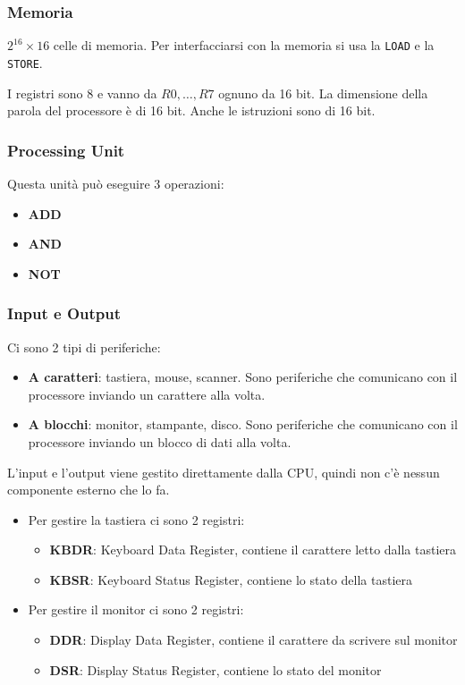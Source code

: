 \documentclass[a4paper]{article}
\theoremstyle{break}
\theoremstyle{break}
\theoremstyle{break}
\theoremstyle{break}
\begin{document}
\subsubsection{Memoria}
\( 2^{16} \times 16 \) celle di memoria. Per interfacciarsi con la memoria si usa la
\texttt{LOAD} e la \texttt{STORE}.

\vspace{1em}
\noindent I registri sono 8 e vanno da \( R0, \ldots, R7 \) ognuno da 16 bit. La dimensione
della parola del processore è di 16 bit. Anche le istruzioni sono di 16 bit.

\subsubsection{Processing Unit}
Questa unità può eseguire 3 operazioni:
\begin{itemize}
	\item \textbf{ADD}
	\item \textbf{AND}
	\item \textbf{NOT}
\end{itemize}

\subsubsection{Input e Output}
Ci sono 2 tipi di periferiche:
\begin{itemize}
	\item \textbf{A caratteri}: tastiera, mouse, scanner. Sono periferiche che comunicano
	      con il processore inviando un carattere alla volta.
	\item \textbf{A blocchi}: monitor, stampante, disco. Sono periferiche che comunicano
	      con il processore inviando un blocco di dati alla volta.
\end{itemize}
L'input e l'output viene gestito direttamente dalla CPU, quindi non c'è nessun componente
esterno che lo fa.
\begin{itemize}
	\item Per gestire la tastiera ci sono 2 registri:
	      \begin{itemize}
		      \item \textbf{KBDR}: Keyboard Data Register, contiene il carattere letto dalla tastiera
		      \item \textbf{KBSR}: Keyboard Status Register, contiene lo stato della tastiera
	      \end{itemize}
	\item Per gestire il monitor ci sono 2 registri:
	      \begin{itemize}
		      \item \textbf{DDR}: Display Data Register, contiene il carattere da scrivere sul monitor
		      \item \textbf{DSR}: Display Status Register, contiene lo stato del monitor
	      \end{itemize}
\end{itemize}
\end{document}
